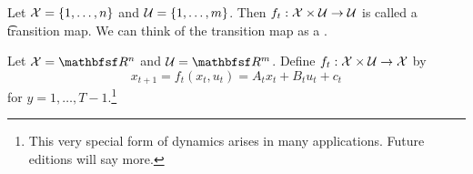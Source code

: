

Let $\mathcal{X} = \{1, \dots, n\}$ and $\mathcal{U} = \{1, \dots, m\}$.
Then $f_t: \mathcal{X} \times \mathcal{U} \to \mathcal{U}$ is called a \t{transition map}.
We can think of the transition map as a .


Let $\CX = \R^n$ and $\CU = \R^m$.
Define $f_t: \mathcal{X} \times \mathcal{U} \to \mathcal{X}$ by
\[
    x_{t+1} = f_t(x_t, u_t) = A_t x_t + B_t u_t + c_t
\]
for $y = 1, \dots, T-1$.\footnote{This very special form of dynamics arises in many applications. Future editions will say more.}
